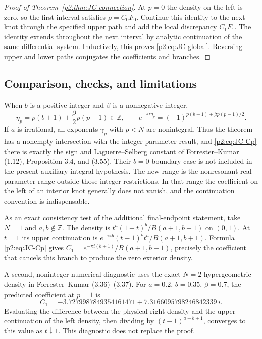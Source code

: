 \documentclass[11pt,a4paper]{article}
\theoremstyle{definition}
\theoremstyle{remark}
\numberwithin{equation}{section}
\begin{document}
\begin{proof}[Proof of Theorem~\ref{p2:thm:JC-connection}]
At $p=0$ the density on the left is zero, so the first interval
satisfies $\rho=C_0F_0$.  Continue this identity to the next knot
through the specified upper path and add the local discrepancy
$C_1F_1$.  The identity extends throughout the next interval by
analytic continuation of the same differential system.  Inductively,
this proves \eqref{p2:eq:JC-global}.  Reversing upper and lower paths
conjugates the coefficients and branches.
\end{proof}

\subsection{Comparison, checks, and limitations}

When $b$ is a positive integer and $\beta$ is a nonnegative integer,
\[
 \eta_p=p(b+1)+\frac\beta2p(p-1)\in\mathbb Z,
 \qquad e^{-\pi i\eta_p}=(-1)^{p(b+1)+\beta p(p-1)/2}.
\]
If $a$ is irrational, all exponents $\gamma_p$ with $p<N$ are
nonintegral.  Thus the theorem has a nonempty intersection with the
integer-parameter result, and \eqref{p2:eq:JC-Cp} there is exactly the
sign and Laguerre--Selberg constant of Forrester--Kumar (1.12),
Proposition 3.4, and (3.55).  Their $b=0$ boundary case is not included
in the present auxiliary-integral hypothesis.
The new range is the nonresonant real-parameter range outside those
integer restrictions.  In that range the coefficient on the left of
an interior knot generally does not vanish, and the continuation
convention is indispensable.

As an exact consistency test of the additional final-endpoint
statement, take $N=1$ and $a,b\notin\mathbb Z$.  The density is
$t^a(1-t)^b/B(a+1,b+1)$ on $(0,1)$.  At $t=1$ its upper
continuation is $e^{-\pi ib}(t-1)^b t^a/B(a+1,b+1)$.
Formula \eqref{p2:eq:JC-Cp} gives
$C_1=e^{-\pi i(b+1)}/B(a+1,b+1)$, precisely the coefficient
that cancels this branch to produce the zero exterior density.

A second, noninteger numerical diagnostic uses the exact $N=2$
hypergeometric density in Forrester--Kumar (3.36)--(3.37).
For $a=0.2$, $b=0.35$, $\beta=0.7$, the predicted coefficient at
$p=1$ is
\[
 C_1=-3.7279987849354161471+7.3166095798246842339\,i.
\]
Evaluating the difference between the physical right density and the
upper continuation of the left density, then dividing by
$(t-1)^{a+b+1}$, converges to this value as $t\downarrow1$.
This diagnostic does not replace the proof.
\end{document}
